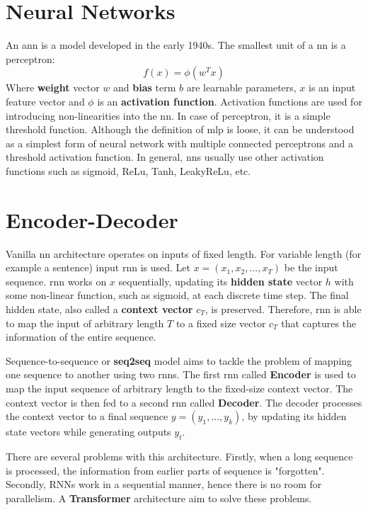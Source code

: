 \section{Neural Networks}
An \Gls{ann} is a model developed in the early 1940s. The smallest unit of a \Gls{nn} is a perceptron:
\begin{equation}
    f(x) = \phi(w^Tx)
\end{equation}
Where \textbf{weight} vector $w$ and \textbf{bias} term $b$ are learnable parameters, $x$ is an input feature vector and $\phi$ is an \textbf{activation function}. Activation functions are used for introducing non-linearities into the \Gls{nn}. In case of perceptron, it is a simple threshold function. Although the definition of \Gls{mlp} is loose, it can be understood as a simplest form of neural network with multiple connected perceptrons and a threshold activation function. In general, \Gls{nn}s usually use other activation functions such as sigmoid, ReLu, Tanh, LeakyReLu, etc.





\section{Encoder-Decoder}
Vanilla \Gls{nn} architecture operates on inputs of fixed length. For variable length (for example a sentence) input \Gls{rnn} is used. Let $x = (x_1,x_2,...,x_T)$ be the input sequence. \gls{rnn} works on $x$ sequentially, updating its \textbf{hidden state} vector $h$ with some non-linear function, such as sigmoid, at each discrete time step. The final hidden state, also called a \textbf{context vector} $c_T$, is preserved.
Therefore, \Gls{rnn} is able to map the input of arbitrary length $T$ to a fixed size vector $c_T$ that captures the information of the entire sequence.

Sequence-to-sequence \cite{sutskever2014sequence,cho2014learning} or \textbf{seq2seq} model aims to tackle the problem of mapping one sequence to another using two \Gls{rnn}s. The first \Gls{rnn} called \textbf{Encoder} is used to map the input sequence of arbitrary length to the fixed-size context vector. The context vector is then fed to a second \Gls{rnn} called \textbf{Decoder}. The decoder processes the context vector to a final sequence $y = (y_1,...,y_k)$, by updating its hidden state vectors while generating outputs $y_t$.

There are several problems with this architecture. Firstly, when a long sequence is processed, the information from earlier parts of sequence is "forgotten". Secondly, RNNs work in a sequential manner, hence there is no room for parallelism. A \textbf{Transformer} architecture aim to solve these problems.





